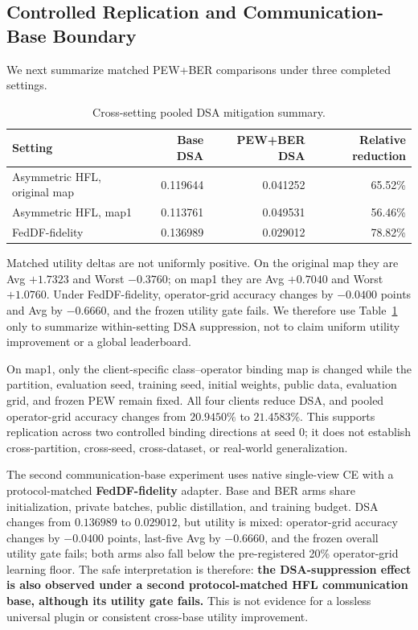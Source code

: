 \documentclass[10pt,twocolumn]{article}
\begin{document}
\subsection{Controlled Replication and Communication-Base Boundary}

We next summarize matched PEW+BER comparisons under three completed settings.

\begin{table}[t]
\centering
\small
\caption{Cross-setting pooled DSA mitigation summary.}
\label{tab:cross-setting}
\begin{tabular}{lrrr}
\toprule
Setting & Base DSA & PEW+BER DSA & Relative reduction \\
\midrule
Asymmetric HFL, original map & 0.119644 & 0.041252 & 65.52\% \\
Asymmetric HFL, map1 & 0.113761 & 0.049531 & 56.46\% \\
FedDF-fidelity & 0.136989 & 0.029012 & 78.82\% \\
\bottomrule
\end{tabular}
\end{table}

Matched utility deltas are not uniformly positive. On the original map they are Avg \(+1.7323\) and Worst \(-0.3760\); on map1 they are Avg \(+0.7040\) and Worst \(+1.0760\). Under FedDF-fidelity, operator-grid accuracy changes by \(-0.0400\) points and Avg by \(-0.6660\), and the frozen utility gate fails. We therefore use Table~\ref{tab:cross-setting} only to summarize within-setting DSA suppression, not to claim uniform utility improvement or a global leaderboard.

On map1, only the client-specific class--operator binding map is changed while the partition, evaluation seed, training seed, initial weights, public data, evaluation grid, and frozen PEW remain fixed. All four clients reduce DSA, and pooled operator-grid accuracy changes from \(20.9450\%\) to \(21.4583\%\). This supports replication across two controlled binding directions at seed 0; it does not establish cross-partition, cross-seed, cross-dataset, or real-world generalization.

The second communication-base experiment uses native single-view CE with a protocol-matched \textbf{FedDF-fidelity} adapter. Base and BER arms share initialization, private batches, public distillation, and training budget. DSA changes from \(0.136989\) to \(0.029012\), but utility is mixed: operator-grid accuracy changes by \(-0.0400\) points, last-five Avg by \(-0.6660\), and the frozen overall utility gate fails; both arms also fall below the pre-registered 20\% operator-grid learning floor. The safe interpretation is therefore: \textbf{the DSA-suppression effect is also observed under a second protocol-matched HFL communication base, although its utility gate fails.} This is not evidence for a lossless universal plugin or consistent cross-base utility improvement.
\end{document}
